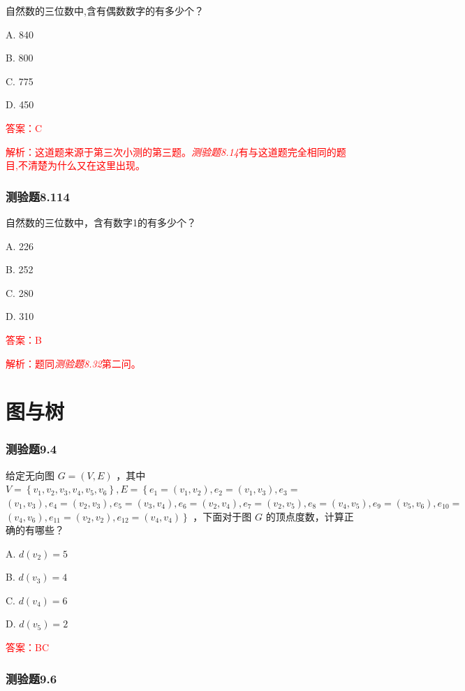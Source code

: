 \documentclass[UTF8, heading=true]{ctexart}
\begin{document}
自然数的三位数中,含有偶数数字的有多少个？

A. 840

B. 800

C. 775

D. 450

\textcolor{red}{答案：C}

\textcolor{red}{解析：这道题来源于第三次小测的第三题。\textit{测验题8.14}有与这道题完全相同的题目,不清楚为什么又在这里出现。}


\subsubsection{测验题8.114}

自然数的三位数中，含有数字1的有多少个？

A. 226

B. 252

C. 280

D. 310

\textcolor{red}{答案：B}

\textcolor{red}{解析：题同\textit{测验题8.32}第二问。}

\clearpage

\section{图与树}


\subsubsection{测验题9.4}

给定无向图 $G=(V, E)$ ，其中 $V=\left\{v_1, v_2, v_3, v_4, v_5, v_6\right\}, E=\left\{e_1=\left(v_1, v_2\right), e_2=\left(v_1, v_3\right), e_3=\right.$ $\left(v_1, v_3\right), e_4=\left(v_2, v_3\right), e_5=\left(v_3, v_4\right), e_6=\left(v_2, v_4\right), e_7=\left(v_2, v_5\right), e_8=\left(v_4, v_5\right), e_9=\left(v_5, v_6\right), e_{10}=$ $\left.\left(v_4, v_6\right), e_{11}=\left(v_2, v_2\right), e_{12}=\left(v_4, v_4\right)\right\}$ ，下面对于图 $G$ 的顶点度数，计算正确的有哪些？

A. $d\left(v_2\right)=5$

B. $d\left(v_3\right)=4$

C. $d\left(v_4\right)=6$

D. $ d\left(v_5\right)=2$

\textcolor{red}{答案：BC}

\subsubsection{测验题9.6}
\end{document}
